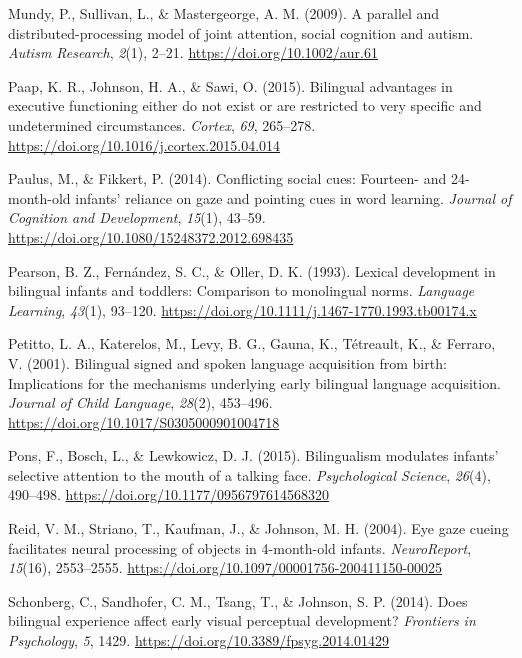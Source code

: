 \documentclass[
  english,
  ,man,floatsintext]{apa6}
\begin{document}
\leavevmode\hypertarget{ref-Mundy_etal_2009}{}%
Mundy, P., Sullivan, L., \& Mastergeorge, A. M. (2009). A parallel and distributed-processing model of joint attention, social cognition and autism. \emph{Autism Research}, \emph{2}(1), 2--21. \url{https://doi.org/10.1002/aur.61}

\leavevmode\hypertarget{ref-Paap_etal_2015}{}%
Paap, K. R., Johnson, H. A., \& Sawi, O. (2015). Bilingual advantages in executive functioning either do not exist or are restricted to very specific and undetermined circumstances. \emph{Cortex}, \emph{69}, 265--278. \url{https://doi.org/10.1016/j.cortex.2015.04.014}

\leavevmode\hypertarget{ref-Paulus_Fikkert_2014}{}%
Paulus, M., \& Fikkert, P. (2014). Conflicting social cues: Fourteen- and 24-month-old infants' reliance on gaze and pointing cues in word learning. \emph{Journal of Cognition and Development}, \emph{15}(1), 43--59. \url{https://doi.org/10.1080/15248372.2012.698435}

\leavevmode\hypertarget{ref-Pearson_etal_1993}{}%
Pearson, B. Z., Fernández, S. C., \& Oller, D. K. (1993). Lexical development in bilingual infants and toddlers: Comparison to monolingual norms. \emph{Language Learning}, \emph{43}(1), 93--120. \url{https://doi.org/10.1111/j.1467-1770.1993.tb00174.x}

\leavevmode\hypertarget{ref-Petitto_etal_2001}{}%
Petitto, L. A., Katerelos, M., Levy, B. G., Gauna, K., Tétreault, K., \& Ferraro, V. (2001). Bilingual signed and spoken language acquisition from birth: Implications for the mechanisms underlying early bilingual language acquisition. \emph{Journal of Child Language}, \emph{28}(2), 453--496. \url{https://doi.org/10.1017/S0305000901004718}

\leavevmode\hypertarget{ref-Pons_etal_2015}{}%
Pons, F., Bosch, L., \& Lewkowicz, D. J. (2015). Bilingualism modulates infants' selective attention to the mouth of a talking face. \emph{Psychological Science}, \emph{26}(4), 490--498. \url{https://doi.org/10.1177/0956797614568320}

\leavevmode\hypertarget{ref-Reid_etal_2004}{}%
Reid, V. M., Striano, T., Kaufman, J., \& Johnson, M. H. (2004). Eye gaze cueing facilitates neural processing of objects in 4-month-old infants. \emph{NeuroReport}, \emph{15}(16), 2553--2555. \url{https://doi.org/10.1097/00001756-200411150-00025}

\leavevmode\hypertarget{ref-Schonberg_etal_2014}{}%
Schonberg, C., Sandhofer, C. M., Tsang, T., \& Johnson, S. P. (2014). Does bilingual experience affect early visual perceptual development? \emph{Frontiers in Psychology}, \emph{5}, 1429. \url{https://doi.org/10.3389/fpsyg.2014.01429}
\end{document}
